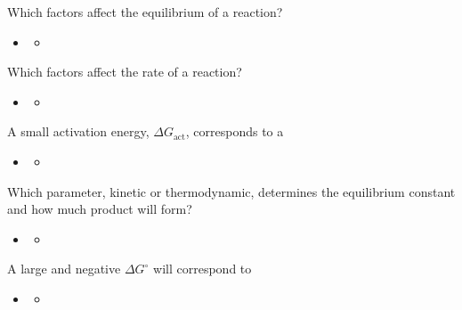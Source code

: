 \documentclass[12pt,a4paper]{article}
\begin{document}
\begin{enumerate}
    {\color{G-Moon}\item Which factors affect the equilibrium of a reaction?}
        \begin{itemize}
            \item {\color{o-Sun}\textbf{}} 
            \begin{itemize}
                \item 
            \end{itemize}
        \end{itemize}
    {\color{G-Moon}\item Which factors affect the rate of a reaction?}
        \begin{itemize}
            \item {\color{o-Sun}\textbf{}} 
            \begin{itemize}
                \item 
            \end{itemize}
        \end{itemize}
    {\color{G-Moon}\item A small activation energy, \(\Delta G_{\text{act}}\), corresponds to a}
        \begin{itemize}
            \item {\color{o-Sun}\textbf{}} 
            \begin{itemize}
                \item 
            \end{itemize}
        \end{itemize}
    {\color{G-Moon}\item Which parameter, kinetic or thermodynamic, determines the equilibrium constant and how much product will form?}
        \begin{itemize}
            \item {\color{o-Sun}\textbf{}} 
            \begin{itemize}
                \item 
            \end{itemize}
        \end{itemize}
    {\color{G-Moon}\item A large and negative \(\Delta G^\circ\) will correspond to}
        \begin{itemize}
            \item {\color{o-Sun}\textbf{}} 
            \begin{itemize}
                \item 
            \end{itemize}
        \end{itemize}
\end{enumerate}
\end{document}
